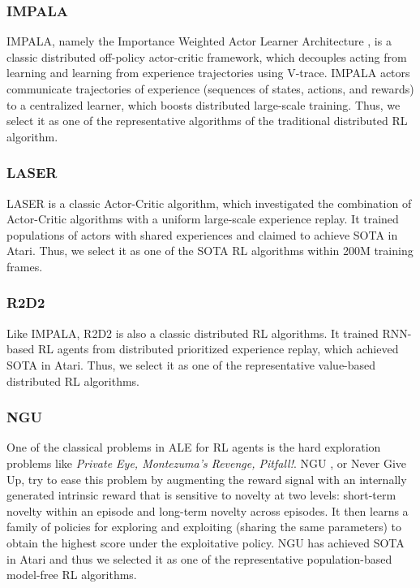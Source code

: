 \documentclass[nohyperref]{article}
\theoremstyle{plain}
\begin{document}
\subsubsection{IMPALA}
IMPALA, namely the Importance Weighted Actor Learner Architecture \citep{impala}, is a classic distributed off-policy actor-critic framework, which decouples acting from learning and learning from experience trajectories using V-trace. IMPALA actors communicate trajectories of experience (sequences of states, actions, and rewards) to a centralized learner, which boosts distributed large-scale training. Thus, we select it as one of the representative algorithms of the traditional distributed RL algorithm.
\subsubsection{LASER}
LASER \citep{laser} is a classic Actor-Critic algorithm, which investigated the combination of Actor-Critic algorithms with a uniform large-scale experience replay. It trained populations of actors with shared experiences and claimed to achieve SOTA in Atari. Thus, we select it as one of the SOTA RL algorithms within 200M training frames.

\subsubsection{R2D2}
\citep{r2d2}
Like IMPALA, R2D2 \citep{r2d2} is also a classic distributed RL algorithms. It trained  RNN-based RL agents from distributed prioritized experience replay, which achieved SOTA in Atari. Thus, we select it as one of the representative value-based distributed RL algorithms.


\subsubsection{NGU}
One of the classical problems in ALE for RL agents is the hard exploration problems \citep{goexplore,ale,agent57} like \textit{Private Eye, Montezuma’s Revenge, Pitfall!}. NGU \citep{ngu}, or Never Give Up, try to ease this problem by augmenting the reward signal with an internally generated intrinsic reward that is sensitive to novelty at two levels: short-term novelty within an episode and long-term novelty across episodes. It then learns a family
of policies for exploring and exploiting (sharing the same parameters) to obtain the highest score under the exploitative policy. NGU has achieved SOTA in Atari and thus  we selected it as one of the representative population-based model-free RL algorithms.
\end{document}
